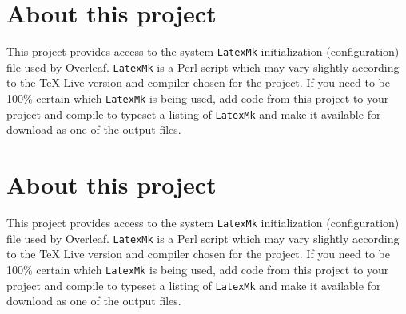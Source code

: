\documentclass[a4paper]{article}
\begin{document}
\section*{About this project}
This project provides access to the system \texttt{LatexMk} initialization (configuration) file used by Overleaf.  \texttt{LatexMk} is a Perl script which may vary slightly according to the \TeX{} Live version and compiler chosen for the project. If you need to be 100\% certain which  \texttt{LatexMk} is being used, add code from this project to your project and compile to typeset a listing of \texttt{LatexMk} and make it available for download as one of the output files.
\section*{About this project}
This project provides access to the system \texttt{LatexMk} initialization (configuration) file used by Overleaf.  \texttt{LatexMk} is a Perl script which may vary slightly according to the \TeX{} Live version and compiler chosen for the project. If you need to be 100\% certain which  \texttt{LatexMk} is being used, add code from this project to your project and compile to typeset a listing of \texttt{LatexMk} and make it available for download as one of the output files.
\end{document}
